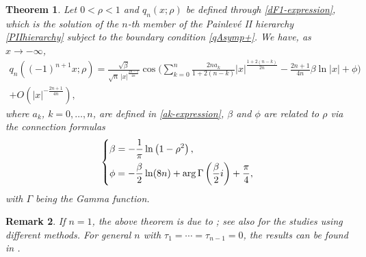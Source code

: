 \documentclass[11pt,a4paper]{article}
\newtheorem{thm}{Theorem}[section]
\newtheorem{rem}[thm]{Remark}
\numberwithin{equation}{section}
\def\arg {\mathop{\rm arg}\nolimits}
\begin{document}
\begin{thm}\label{q-asymptotic}
Let $0<\rho<1$ and $q_{n}(x;\rho)$ be defined through \eqref{dF1-expression}, which is the solution of the $n$-th member of the Painlev\'e II hierarchy \eqref{PIIhierarchy}
subject to the boundary condition \eqref{qAsymp+}.
We have, as $x\to-\infty$,
\begin{multline}\label{qAymp-1}
q_{n}\left((-1)^{n+1}x;\rho\right)=\frac{\sqrt{\beta}}{\sqrt{n}\,|x|^{\frac{2 n-1}{4 n}}}
\cos\Bigg(\sum_{k=0}^{n}\frac{2na_k}{1+2(n-k)}|x|^{\frac{1+2(n-k)}{2n}}
-\frac{2n+1}{4n}\beta\ln|x|+\phi\Bigg)
\\
+O\left(|x|^{-\frac{2n+1}{4n}}\right),
\end{multline}
where $a_k$, $k=0,\ldots,n$, are defined in \eqref{ak-expression}, $\beta$ and $\phi$ are related to $\rho$ via the connection formulas
\begin{equation}\label{beta}
\left\{\begin{aligned}
&\beta=-\frac{1}{\pi}\ln\left(1-\rho^2\right ),\\
&\phi=-\frac{\beta}{2}\ln(8n)+\arg\Gamma\left(\frac{\beta}{2} i\right)+ \frac{\pi}{4},%
\end{aligned}\right.
\end{equation}
with $\Gamma$ being the Gamma function.
\end{thm}

\begin{rem}
If $n=1$, the above theorem is due to \cite{AS1976,AS81}; see also \cite{CM-1988,DZ1995,HM80} for the studies using different methods. For general $n$ with $\tau_1=\cdots=\tau_{n-1}=0$, the results can be found in
\cite[Theorem 1.1]{HZ2021}.
\end{rem}
\end{document}
